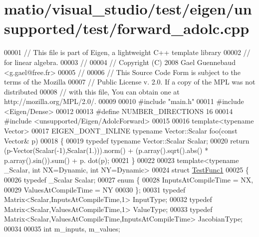 \hypertarget{matio_2visual__studio_2test_2eigen_2unsupported_2test_2forward__adolc_8cpp_source}{}\section{matio/visual\+\_\+studio/test/eigen/unsupported/test/forward\+\_\+adolc.cpp}
\label{matio_2visual__studio_2test_2eigen_2unsupported_2test_2forward__adolc_8cpp_source}

\begin{DoxyCode}
00001 \textcolor{comment}{// This file is part of Eigen, a lightweight C++ template library}
00002 \textcolor{comment}{// for linear algebra.}
00003 \textcolor{comment}{//}
00004 \textcolor{comment}{// Copyright (C) 2008 Gael Guennebaud <g.gael@free.fr>}
00005 \textcolor{comment}{//}
00006 \textcolor{comment}{// This Source Code Form is subject to the terms of the Mozilla}
00007 \textcolor{comment}{// Public License v. 2.0. If a copy of the MPL was not distributed}
00008 \textcolor{comment}{// with this file, You can obtain one at http://mozilla.org/MPL/2.0/.}
00009 
00010 \textcolor{preprocessor}{#include "main.h"}
00011 \textcolor{preprocessor}{#include <Eigen/Dense>}
00012 
00013 \textcolor{preprocessor}{#define NUMBER\_DIRECTIONS 16}
00014 \textcolor{preprocessor}{#include <unsupported/Eigen/AdolcForward>}
00015 
00016 \textcolor{keyword}{template}<\textcolor{keyword}{typename} Vector>
00017 EIGEN\_DONT\_INLINE \textcolor{keyword}{typename} Vector::Scalar foo(\textcolor{keyword}{const} Vector& p)
00018 \{
00019   \textcolor{keyword}{typedef} \textcolor{keyword}{typename} Vector::Scalar Scalar;
00020   \textcolor{keywordflow}{return} (p-Vector(Scalar(-1),Scalar(1.))).norm() + (p.array().sqrt().abs() * p.array().sin()).sum() + p.
      dot(p);
00021 \}
00022 
00023 \textcolor{keyword}{template}<\textcolor{keyword}{typename} \_Scalar, \textcolor{keywordtype}{int} NX=Dynamic, \textcolor{keywordtype}{int} NY=Dynamic>
00024 \textcolor{keyword}{struct }\hyperlink{struct_test_func1}{TestFunc1}
00025 \{
00026   \textcolor{keyword}{typedef} \_Scalar Scalar;
00027   \textcolor{keyword}{enum} \{
00028     InputsAtCompileTime = NX,
00029     ValuesAtCompileTime = NY
00030   \};
00031   \textcolor{keyword}{typedef} Matrix<Scalar,InputsAtCompileTime,1> InputType;
00032   \textcolor{keyword}{typedef} Matrix<Scalar,ValuesAtCompileTime,1> ValueType;
00033   \textcolor{keyword}{typedef} Matrix<Scalar,ValuesAtCompileTime,InputsAtCompileTime> JacobianType;
00034 
00035   \textcolor{keywordtype}{int} m\_inputs, m\_values;

\end{DoxyCode}
